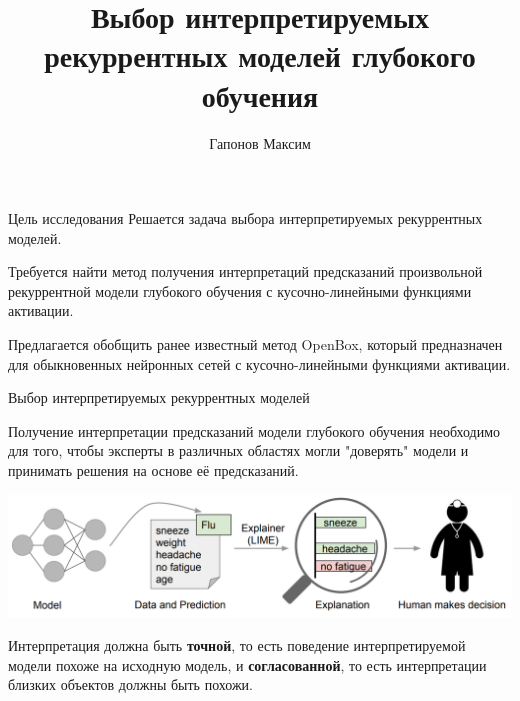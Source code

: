 \documentclass{beamer}
\title[\hbox to 56mm{Тема}]{Выбор интерпретируемых рекуррентных моделей глубокого обучения}
\author[Н.\,П. Ивкин]{Гапонов Максим}
\institute{Московский физико-технический институт}
\date{\footnotesize
\par\smallskip\emph{Эксперт:} Бахтеев Олег
\par\smallskip\emph{Консультант:} Яковлев Константин
\par\bigskip\small 2022}
\begin{document}
\begin{frame}
\thispagestyle{empty}
\maketitle
\end{frame}
\begin{frame}{Цель исследования}
Решается задача выбора интерпретируемых рекуррентных моделей.
\bigskip

Требуется найти метод получения интерпретаций предсказаний произвольной рекуррентной модели глубокого обучения с кусочно-линейными функциями активации.
\bigskip

Предлагается обобщить ранее известный метод OpenBox, который предназначен для обыкновенных нейронных сетей с кусочно-линейными функциями активации.
\end{frame}
\begin{frame}{Выбор интерпретируемых рекуррентных моделей}

Получение интерпретации предсказаний модели глубокого обучения необходимо для того, чтобы эксперты в различных областях могли "доверять" модели и принимать решения на основе её предсказаний.

\includegraphics[width=\textwidth]{../figures/lime_int_exp.png}

Интерпретация должна быть {\color{red}\textbf{точной}}, то есть поведение интерпретируемой модели похоже на исходную модель, и {\color{red}\textbf{согласованной}}, то есть интерпретации близких объектов должны быть похожи.

\end{frame}
\end{document}
